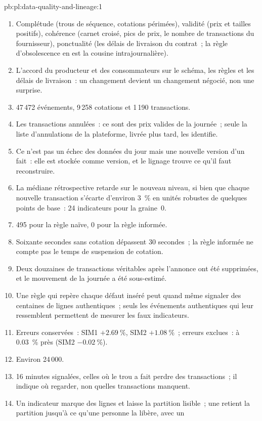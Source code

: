 \begin{solution}{pb:pl:data-quality-and-lineage:1}
\begin{enumerate}
\item Complétude (trous de séquence, cotations périmées), validité (prix et tailles positifs), cohérence (carnet croisé, pics de prix, le
nombre de transactions du fournisseur), ponctualité (les délais de livraison du contrat~; la règle d'obsolescence en est la cousine intrajournalière).
\item L'accord du producteur et des consommateurs sur le schéma, les règles et les délais de livraison~: un changement devient un changement négocié, non une
surprise.
\item 47\,472 événements, 9\,258 cotations et 1\,190 transactions.
\item Les transactions annulées~: ce sont des prix valides de la journée~; seule la liste d'annulations de la plateforme, livrée plus tard, les identifie.
\item Ce n'est pas un échec des données du jour mais une nouvelle version d'un fait~: elle est stockée comme version, et le lignage trouve ce qu'il faut
reconstruire.
\item La médiane rétrospective retarde sur le nouveau niveau, si bien que chaque nouvelle transaction s'écarte d'environ 3~\% en unités robustes de quelques points de base~: 24 indicateurs
pour la graine~0.
\item 495 pour la règle naïve, 0 pour la règle informée.
\item Soixante secondes sans cotation dépassent 30 secondes~; la règle informée ne compte pas le temps de suspension de cotation.
\item Deux douzaines de transactions véritables après l'annonce ont été supprimées, et le mouvement de la journée a été sous-estimé.
\item Une règle qui repère chaque défaut inséré peut quand même signaler des centaines de lignes authentiques~; seuls les événements authentiques qui leur ressemblent permettent de mesurer les faux indicateurs.
\item Erreurs conservées~: SIM1 $+2.69~\%$, SIM2 $+1.08~\%$~; erreurs exclues~: à 0.03~\% près (SIM2 $-0.02~\%$).
\item Environ 24\,000.
\item 16 minutes signalées, celles où le trou a fait perdre des transactions~; il indique où regarder, non quelles transactions manquent.
\item Un indicateur marque des lignes et laisse la partition lisible~; une  retient la partition jusqu'à ce qu'une personne la libère, avec un

\end{enumerate}
\end{solution}
